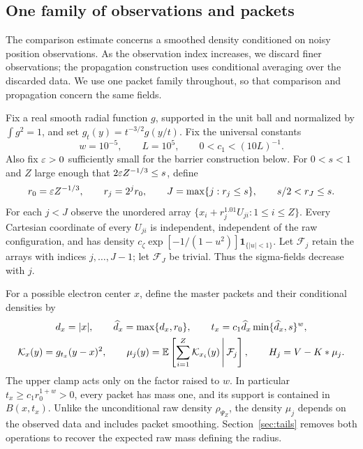 \subsection{One family of observations and packets}

The comparison estimate concerns a smoothed density conditioned on noisy
position observations.  As the observation index increases, we discard
finer observations; the propagation construction uses conditional
averaging over the discarded data.  We use one packet family throughout,
so that comparison and propagation concern the same fields.

Fix a real smooth radial function $g$, supported in the unit ball and
normalized by $\int g^2=1$, and set
$g_t(y)=t^{-3/2}g(y/t)$.  Fix the universal constants
\[
 w=10^{-5},\qquad L=10^5,\qquad 0<c_1<(10L)^{-1}.
\]
Also fix $\varepsilon>0$ sufficiently small for the barrier construction below.
For $0<s<1$ and $Z$ large enough that $2\varepsilon Z^{-1/3}\le s$, define
\begin{equation}\label{inp:observations}
 r_0=\varepsilon Z^{-1/3},\qquad r_j=2^jr_0,\qquad
 J=\max\{j:r_j\le s\},\qquad s/2<r_J\le s.
\end{equation}
For each $j<J$ observe the unordered array
$\{x_i+r_j^{1.01}U_{ji}:1\le i\le Z\}$.  Every Cartesian
coordinate of every $U_{ji}$ is independent, independent of the raw
configuration, and has density
$c_\zeta\exp[-1/(1-u^2)]\mathbf1_{\{|u|<1\}}$.
Let $\mathcal F_j$ retain the arrays with indices $j,\ldots,J-1$;
let $\mathcal F_J$ be trivial.  Thus the sigma-fields decrease with $j$.

For a possible electron center $x$, define the master packets and their
conditional densities by
\begin{equation}\label{inp:packets}
 \begin{gathered}
 d_x=|x|,\qquad \widehat d_x=\max\{d_x,r_0\},\qquad
 t_x=c_1\widehat d_x\min\{\widehat d_x,s\}^{w},\\
 \mathcal K_x(y)=g_{t_x}(y-x)^2,\qquad
 \mu_j(y)=\mathbb E\left[\sum_{i=1}^Z\mathcal K_{x_i}(y)
                  \,\middle|\,\mathcal F_j\right],
 \qquad H_j=V-K*\mu_j .
 \end{gathered}
\end{equation}
The upper clamp acts only on the factor raised to $w$.
In particular $t_x\ge c_1r_0^{1+w}>0$, every packet has mass one,
and its support is contained in $B(x,t_x)$.
Unlike the unconditional raw density $\rho_{\Psi_Z}$, the density
$\mu_j$ depends on the observed data and includes packet smoothing.
Section~\ref{sec:tails} removes both operations to recover the expected
raw mass defining the radius.


